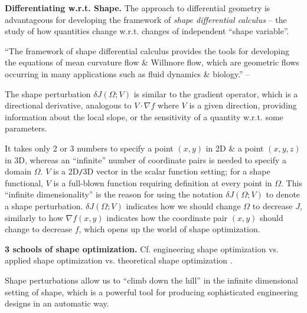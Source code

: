 \documentclass{article}
\begin{document}
\begin{enumerate}
	{\bf Differentiating w.r.t. Shape.} The approach to differential geometry is advantageous for developing the framework of {\it shape differential calculus} -- the study of how quantities change w.r.t. changes of independent ``shape variable''.

	``The framework of shape differential calculus provides the tools for developing the equations of mean curvature flow \& Willmore flow, which are geometric flows occurring in many applications such as fluid dynamics \& biology.'' -- \cite[p. 2]{Walker2015}

	The shape perturbation $\delta J(\Omega;V)$ is similar to the gradient operator, which is a directional derivative, analogous to $V\cdot\nabla f$ where $V$ is a given direction, providing information about the local slope, or the sensitivity of a quantity w.r.t. some parameters.

	It takes only 2 or 3 numbers to specify a point $(x,y)$ in 2D \& a point $(x,y,z)$ in 3D, whereas an ``infinite'' number of coordinate pairs is needed to specify a domain $\Omega$. $V$ is a 2D{\tt/}3D vector in the scalar function setting; for a shape functional, $V$ is a full-blown function requiring definition at every point in $\Omega$. This ``infinite dimensionality'' is the reason for using the notation $\delta J(\Omega;V)$ to denote a shape perturbation. $\delta J(\Omega;V)$ indicates how we should change $\Omega$ to decrease $J$, similarly to how $\nabla f(x,y)$ indicates how the coordinate pair $(x,y)$ should change to decrease $f$, which opens up the world of shape optimization.

	{\bf3 schools of shape optimization.} Cf. engineering shape optimization vs. applied shape optimization \cite{Mohammadi_Pironneau2010} vs. theoretical shape optimization \cite{Sokolowski_Zolesio1992,Delfour_Zolesio2011}.

	Shape perturbations allow us to ``climb down the hill'' in the infinite dimensional setting of shape, which is a powerful tool for producing sophisticated engineering designs in an automatic way.


\end{enumerate}
\end{document}
